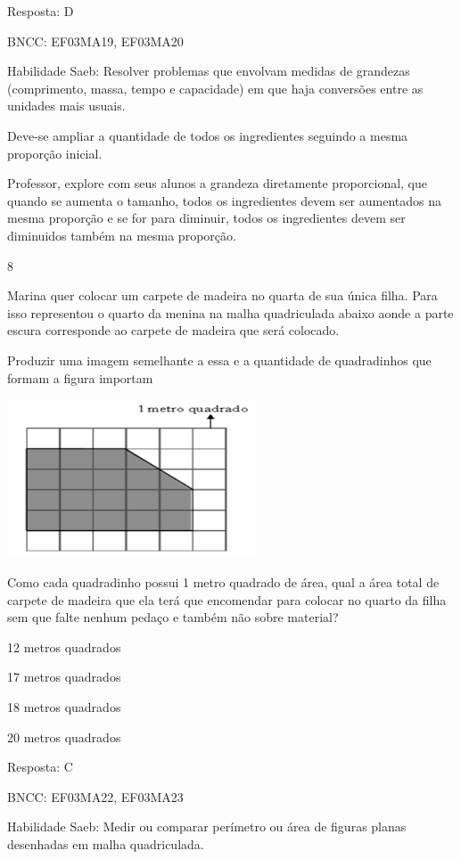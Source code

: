 \begin{escolha}
{\begin{escolha}
{Resposta: D

BNCC: EF03MA19, EF03MA20

Habilidade Saeb: Resolver problemas que envolvam medidas de grandezas
(comprimento, massa, tempo e capacidade) em que haja conversões entre as
unidades mais usuais.

Deve-se ampliar a quantidade de todos os ingredientes seguindo a mesma
proporção inicial.

Professor, explore com seus alunos a grandeza diretamente proporcional,
que quando se aumenta o tamanho, todos os ingredientes devem ser
aumentados na mesma proporção e se for para diminuir, todos os
ingredientes devem ser diminuidos também na mesma proporção.

\num{8}

Marina quer colocar um carpete de madeira no quarta de sua única filha.
Para isso representou o quarto da menina na malha quadriculada abaixo
aonde a parte escura corresponde ao carpete de madeira que será
colocado.

Produzir uma imagem semelhante a essa e a quantidade de quadradinhos que
formam a figura importam

\includegraphics[width=2.90385in,height=1.84662in]{media/image123.png}

Como cada quadradinho possui 1 metro quadrado de área, qual a área total
de carpete de madeira que ela terá que encomendar para colocar no quarto
da filha sem que falte nenhum pedaço e também não sobre material?

\begin{escolha}
\item
  12 metros quadrados
\item
  17 metros quadrados
\item
  18 metros quadrados
\item
  20 metros quadrados
\end{escolha}

Resposta: C

BNCC: EF03MA22, EF03MA23

Habilidade Saeb: Medir ou comparar perímetro ou área de figuras planas
desenhadas em malha quadriculada.

}
\end{escolha}}
\end{escolha}

